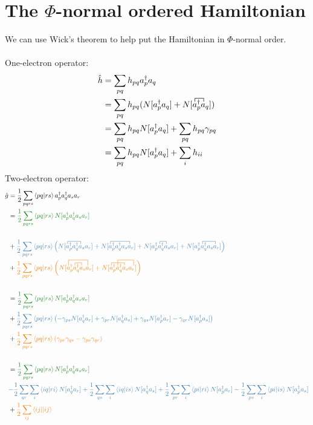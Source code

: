\documentclass{article}
\newcommand{\fctr}{\contraction}
\newcommand{\dg}{\ensuremath{^\dagger} }
\def\cb#1{{\color{blue}#1}}
\def\co#1{{\color{orange}#1}}
\def\cg#1{{\color{green}#1}}
\begin{document}
\section{The $\Phi$-normal ordered Hamiltonian}
We can use Wick's theorem to help put the Hamiltonian in $\Phi$-normal order.
\\ \\
One-electron operator:
\begin{align*}
\hat{h} &= \sum_{pq} h_{pq} a_p\dg a_q \\
 &= \sum_{pq}h_{pq} (N[a_p\dg a_q] + N[\fctr{}{a}{{}_p\dg}{a} a_p\dg a_q]) \\
&= \sum_{pq}h_{pq} N[a_p\dg a_q] + \sum_{pq}h_{pq} \gamma_{pq} \\
&= \sum_{pq}h_{pq} N[a_p\dg a_q] + \sum_{i}h_{ii} \\
\end{align*}
Two-electron operator:
\begin{align*}
\hat{g} &=  \frac{1}{2} \sum_{pqrs} \braket{pq | rs} a_p\dg a_q\dg a_s a_r \\
&= \cg{\frac{1}{2} \sum_{pqrs} \braket{pq | rs} N[a_p\dg a_q\dg a_s a_r] } \\ \\
&+ \cb{\frac{1}{2} \sum_{pqrs} \braket{pq | rs} \left(N[\fctr{}{a}{{}_p\dg a_q\dg}{a}  a_p\dg a_q\dg a_s a_r] + 
N[\fctr{}{a}{{}_p\dg a_q\dg a_s}{a}  a_p\dg a_q\dg a_s a_r] + 
N[\fctr{a_p\dg}{a}{{}_q\dg }{a}  a_p\dg a_q\dg a_s a_r] + 
N[\fctr{a_p\dg}{a}{{}_q\dg a_s }{a}  a_p\dg a_q\dg a_s a_r] \right)} \\
&+ \co{ \frac{1}{2} \sum_{pqrs} \braket{pq | rs} \left( 
N[\fctr[2ex]{}{a}{{}_p\dg a_q\dg a_s }{a} \fctr{a_p\dg}{a}{{}_q\dg}{a}  a_p\dg a_q\dg a_s a_r] +
N[\fctr{}{a}{{}_p\dg a_q\dg }{a}  \fctr[2ex]{a_p\dg}{a}{{}q\dg a_s}{a} a_p\dg a_q\dg a_s a_r]  
  \right) } \\  \\
&= \cg{\frac{1}{2} \sum_{pqrs} \braket{pq | rs} N[a_p\dg a_q\dg a_s a_r] } \\ 
&+ \cb{\frac{1}{2} \sum_{pqrs} \braket{pq | rs} \left(-\gamma_{ps} N[ a_q\dg a_r] + 
\gamma_{pr} N[ a_q\dg a_s ] + 
\gamma_{qs} N[ a_p\dg a_r] -
\gamma_{qr} N[ a_p\dg a_s] \right)} \\
&+ \co{ \frac{1}{2} \sum_{pqrs} \braket{pq | rs} ( \gamma_{pr}\gamma_{qs} -\gamma_{ps}\gamma_{qr}) }\\ \\
&= \cg{\frac{1}{2} \sum_{pqrs} \braket{pq | rs} N[a_p\dg a_q\dg a_s a_r] } \\
& \cb{- \frac{1}{2} \sum_{qr} \sum_i \braket{iq | ri} N[ a_q\dg a_r] +  
\frac{1}{2} \sum_{qs} \sum_i \braket{iq | is} N[ a_q\dg a_s ] + 
\frac{1}{2} \sum_{pr} \sum_i \braket{pi | ri} N[ a_p\dg a_r] -
\frac{1}{2} \sum_{ps} \sum_i \braket{pi | is} N[ a_p\dg a_s] } \\
&+ \co{ \frac{1}{2} \sum_{ij} \braket{ij || ij} }
\end{align*}
\end{document}
